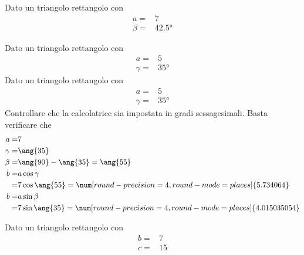 \begin{exercise}[no solution]
	Dato un triangolo rettangolo con
	\begin{align*}
	a=&7\\
	\beta=&\ang{42.5}
	\end{align*}
\end{exercise}
  \begin{exercise}
  	Dato un triangolo rettangolo con
  	\begin{align*}
  	a=&5\\
  	\gamma=&\ang{35}
  	\end{align*}
  	\tcblower
  		Dato un triangolo rettangolo con
  	\begin{align*}
  	a=&5\\
  	\gamma=&\ang{35}
  	\end{align*}
  	Controllare che la calcolatrice sia impostata in gradi sessagesimali.
  	Basta verificare che \testgradi 
  	\begin{align*}
  	a=& 7\\
  	\gamma=&\ang{35}\\
  	\beta=&\ang{90}-\ang{35}=\ang{55}\\
  	b=&a\cos\gamma\\
  	=& 7\cos\ang{55}=\num[round-precision=\lungarrotandamento,round-mode=places]{5.734064}\\
  	b=&a\sin\beta\\
  	=& 7\sin\ang{35}=\num[round-precision=\lungarrotandamento,round-mode=places]{4.015035054}
  	\end{align*}
  \end{exercise}
 \begin{exercise}[no solution]
	Dato un triangolo rettangolo con
	\begin{align*}
	b=&7\\
	c=&15\\
	\end{align*}
\end{exercise}
